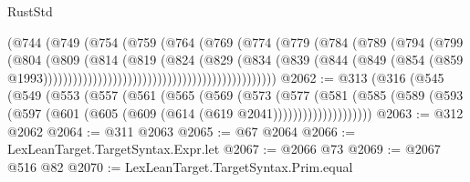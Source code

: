 \begin{lexlean}{RustStd}
\begin{coremodule}
{\begin{coremodule}
{{{{{{{{{{{{{{{{{{{{{{{{{{                                                  (@744
                                                    (@749
                                                      (@754
                                                        (@759
                                                          (@764
                                                            (@769
                                                              (@774
                                                                (@779
                                                                  (@784
                                                                    (@789
                                                                      (@794
                                                                        (@799
                                                                          (@804
                                                                            (@809
                                                                              (@814
                                                                                (@819
                                                                                  (@824
                                                                                    (@829
                                                                                      (@834
                                                                                        (@839
                                                                                          (@844
                                                                                            (@849
                                                                                              (@854
                                                                                                (@859
                                                                                                  @1993)))))))))))))))))))))))))))))))))))))))))))))))
@2062 := @313
    (@316
      (@545
        (@549
          (@553
            (@557
              (@561
                (@565
                  (@569
                    (@573
                      (@577
                        (@581
                          (@585
                            (@589
                              (@593 (@597 (@601 (@605 (@609 (@614 (@619 @2041))))))))))))))))))))
@2063 := @312 @2062
@2064 := @311 @2063
@2065 := @67 @2064
@2066 := LexLeanTarget.TargetSyntax.Expr.let
@2067 := @2066 @73
@2069 := @2067 @516 @82
@2070 := LexLeanTarget.TargetSyntax.Prim.equal
}}}}}}}}}}}}}}}}}}}}}}}}}}
\end{coremodule}}
\end{coremodule}
\end{lexlean}
